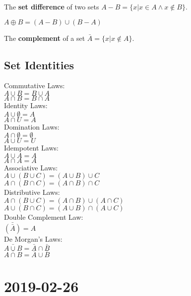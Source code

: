 \documentclass{article}
\theoremstyle{definition}
\begin{document}
The \textbf{set difference} of two sets
$A - B = \{x | x \in A \land x \notin B \}$.

$A \oplus B = (A-B)\cup(B-A)$

The \textbf{complement} of a set
$\bar{A}=\{x|x \notin A\}$.

\subsection*{Set Identities}

Commutative Laws:\\
$A \cup B = B \cup A$\\
$A \cap B = B \cap A$\\

Identity Laws:\\
$A \cup \emptyset = A$\\
$A \cap U = A$\\

Domination Laws:\\
$A \cap \emptyset = \emptyset$ \\
$A \cup U = U$\\

Idempotent Laws:\\
$A \cup A = A$\\
$A \cap A = A$\\

Associative Laws:\\
$A \cup (B \cup C) = (A \cup B) \cup C$\\
$A \cap (B \cap C) = (A \cap B) \cap C$\\

Distributive Laws:\\
$A \cap (B \cup C) = (A \cap B) \cup (A \cap C)$\\
$A \cup (B \cap C) = (A \cup B) \cap (A \cup C)$\\

Double Complement Law:\\
$\bar{(\bar{A})}=A$\\

De Morgan's Laws:\\
$\bar{A \cup B} = \bar{A} \cap \bar{B}$\\
$\bar{A \cap B} = \bar{A} \cup \bar{B}$\\

\section*{2019-02-26}
\end{document}
